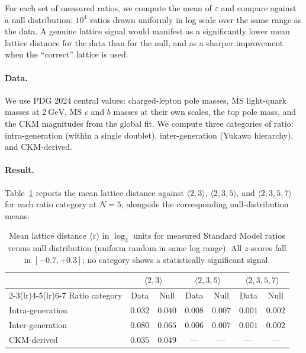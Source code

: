 \documentclass[11pt]{article}
\theoremstyle{plain}
\theoremstyle{remark}
\begin{document}
For each set of measured ratios, we compute the mean of
$\varepsilon$ and compare against a null distribution: $10^4$
ratios drawn uniformly in log scale over the same range as the
data.  A genuine lattice signal would manifest as a
significantly lower mean lattice distance for the data than for
the null, and as a sharper improvement when the
``correct'' lattice is used.

\paragraph{Data.}
We use PDG 2024 central values: charged-lepton pole masses,
$\overline{\mathrm{MS}}$ light-quark masses at $2~\mathrm{GeV}$,
$\overline{\mathrm{MS}}$ $c$ and $b$ masses at their own scales,
the top pole mass, and the CKM magnitudes from the global fit.
We compute three categories of ratio: intra-generation
(within a single doublet), inter-generation (Yukawa hierarchy),
and CKM-derived.

\paragraph{Result.}
Table~\ref{tab:empirical-result} reports the mean lattice
distance against $\langle 2, 3 \rangle$, $\langle 2, 3, 5 \rangle$,
and $\langle 2, 3, 5, 7 \rangle$ for each ratio category at
$N = 5$, alongside the corresponding null-distribution means.

\begin{table}[h]
\centering
\small
\begin{tabular}{lcccccc}
\toprule
& \multicolumn{2}{c}{$\langle 2, 3 \rangle$}
& \multicolumn{2}{c}{$\langle 2, 3, 5 \rangle$}
& \multicolumn{2}{c}{$\langle 2, 3, 5, 7 \rangle$}\\
\cmidrule(lr){2-3}\cmidrule(lr){4-5}\cmidrule(lr){6-7}
Ratio category & Data & Null
& Data & Null
& Data & Null \\
\midrule
Intra-generation & $0.032$ & $0.040$
& $0.008$ & $0.007$
& $0.001$ & $0.002$ \\
Inter-generation & $0.080$ & $0.065$
& $0.006$ & $0.007$
& $0.001$ & $0.002$ \\
CKM-derived      & $0.035$ & $0.049$
& --- & ---
& --- & --- \\
\bottomrule
\end{tabular}
\caption{Mean lattice distance $\langle \varepsilon \rangle$ in
$\log_2$ units for measured Standard Model ratios versus
null distribution (uniform random in same log range).  All
$z$-scores fall in $[-0.7, +0.3]$; no category shows a
statistically significant signal.}
\label{tab:empirical-result}
\end{table}
\end{document}
